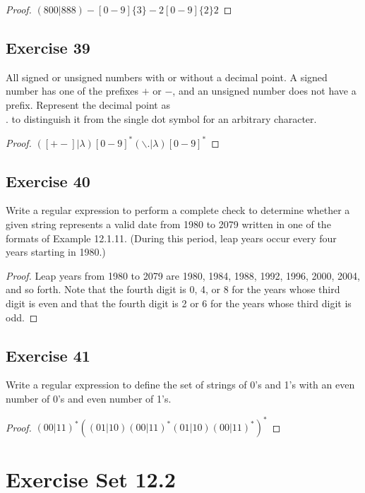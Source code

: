 \documentclass[14pt]{extarticle}
\begin{document}
\begin{proof}
\((800|888)-[0-9]\{3\}-2[0-9]\{2\}2\)
\end{proof}

\subsection{Exercise 39}
All signed or unsigned numbers with or without a decimal point. A signed number has one of the prefixes \(+\) or \(-\), 
and an unsigned number does not have a prefix. Represent the decimal point as \\. to distinguish it from the single dot 
symbol for an arbitrary character.

\begin{proof}
\(([+ -] | \lambda)[0 - 9]^* (\backslash. | \lambda)[0 - 9]^*\)
\end{proof}

\subsection{Exercise 40}
Write a regular expression to perform a complete check to determine whether a given string represents a valid date from 
1980 to 2079 written in one of the formats of Example 12.1.11. (During this period, leap years occur every four years 
starting in 1980.)

\begin{proof}
Leap years from 1980 to 2079 are 1980, 1984, 1988, 1992, 1996, 2000, 2004, and so forth. Note that the fourth digit is 0, 4, 
or 8 for the years whose third digit is even and that the fourth digit is 2 or 6 for the years whose third digit is odd.
\end{proof}

\subsection{Exercise 41}
Write a regular expression to define the set of strings of 0’s and 1’s with an even number of 0’s and even number of 1’s.

\begin{proof}
\((00|11)^*\left((01|10)(00|11)^*(01|10)(00|11)^*\right)^*\)
\end{proof}

\section{Exercise Set 12.2}
\end{document}
